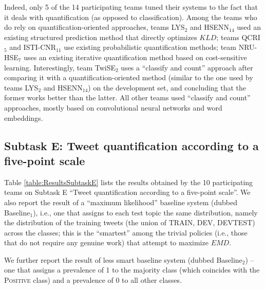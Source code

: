 \documentclass[11pt,letterpaper]{article}
\begin{document}
Indeed, only 5 of the 14 participating teams tuned their systems to
the fact that it deals with
quantification (as opposed to classification). Among the teams who do
rely on quantification-oriented approaches, teams LYS$_{2}$ and
HSENN$_{14}$ used an existing structured prediction method that
directly optimizes $KLD$; teams QCRI$_{5}$ and ISTI-CNR$_{11}$ use
existing probabilistic quantification methods; team NRU-HSE$_{7}$ uses
an existing iterative quantification method based on cost-sensitive
learning. Interestingly, team TwiSE$_{2}$ uses a ``classify and
count'' approach after comparing it with a quantification-oriented
method (similar to the one used by teams LYS$_{2}$ and HSENN$_{14}$)
on the development set, and concluding that the former works better
than the latter. All other teams used ``classify and count''
approaches, mostly based on convolutional neural networks and word
embeddings.


\subsection{Subtask E: Tweet quantification according to a five-point
scale}
\label{sec:4Ediscussion}

\noindent Table \ref{table:ResultsSubtaskE} lists the results obtained
by the 10 participating teams on Subtask E ``Tweet quantification according
to a five-point scale''. We also report the result of a ``maximum
likelihood'' baseline system (dubbed Baseline$_1$), i.e., one that
assigns to each test topic the same distribution, namely the distribution of the training tweets
(the union of TRAIN, DEV, DEVTEST) across the classes; this is the
``smartest'' among the trivial policies (i.e., those that do not
require any genuine work) that attempt to maximize $EMD$.

We further report the result of less smart baseline system (dubbed
Baseline$_2$) -- one that assigns a prevalence of 1 to the
majority class (which coincides with the \textsc{Positive} class) and a
prevalence of 0 to all other classes.
\end{document}
